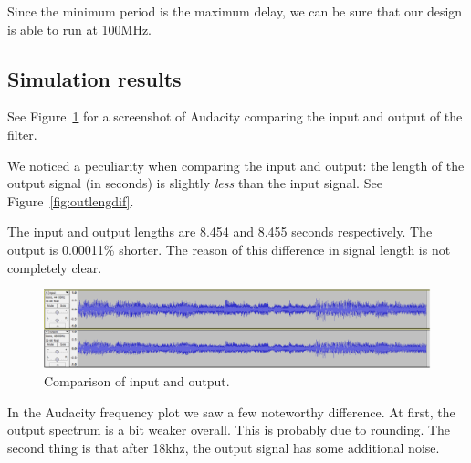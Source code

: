 \documentclass[a4paper,twoside,11pt, fleqn]{article}
\begin{document}
Since the minimum period is the maximum delay, we can be sure that our design is able to run at 100MHz.

\newpage
\subsection{Simulation results}
See Figure~\ref{fig:compInOut} for a screenshot of Audacity comparing the input and output of the filter.

We noticed a peculiarity when comparing the input and output: the length of the output signal (in seconds) is slightly \textit{less} than the input signal. See Figure~\ref{fig:outlengdif}.

The input and output lengths are 8.454 and 8.455 seconds respectively. The output is 0.00011\% shorter. The reason of this difference in signal length is not completely clear.

\begin{figure}[h]
	\includegraphics[scale = 0.40]{Images/simulationresults.png}
    \caption{Comparison of input and output.}
    \label{fig:compInOut}
\end{figure}

In the Audacity frequency plot we saw a few noteworthy difference. At first, the output spectrum is a bit weaker overall. This is probably due to rounding. The second thing is that after 18khz, the output signal has some additional noise. 
\end{document}
